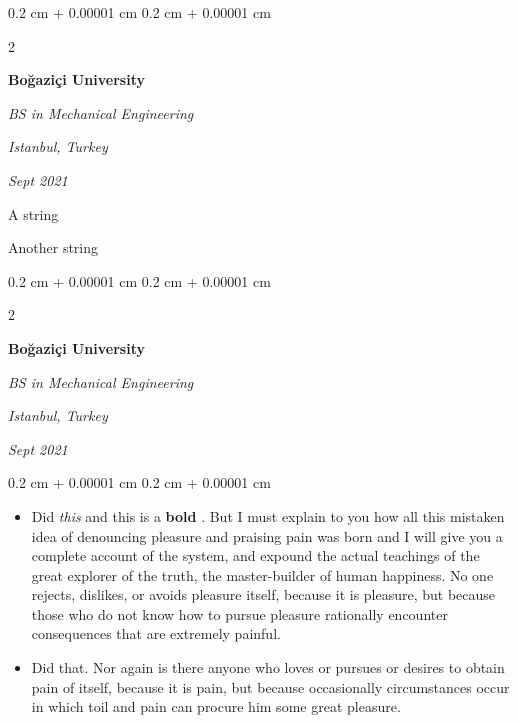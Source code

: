 \documentclass[10pt, letterpaper]{article}
\newenvironment{summary}{
    \begin{description}[
        topsep=0.10 cm,
        parsep=0.10 cm,
        partopsep=0pt,
        itemsep=0pt,
        leftmargin=0.4 cm + 10pt
    ]
}{
    \end{description}
} %
\newenvironment{highlights}{
    \begin{itemize}[
        topsep=0.10 cm,
        parsep=0.10 cm,
        partopsep=0pt,
        itemsep=0pt,
        leftmargin=0.4 cm + 10pt
    ]
}{
    \end{itemize}
} %
\newenvironment{onecolentry}{
    \begin{adjustwidth}{
        0.2 cm + 0.00001 cm
    }{
        0.2 cm + 0.00001 cm
    }
}{
    \end{adjustwidth}
} %
\newenvironment{twocolentry}[2][]{
    \onecolentry
    \def\secondColumn{#2}
    \setcolumnwidth{\fill, 4.5 cm}
    \begin{paracol}{2}
}{
    \switchcolumn \raggedleft \secondColumn
    \end{paracol}
    \endonecolentry
} %
\let\hrefWithoutArrow\href
\renewcommand{\href}[2]{\hrefWithoutArrow{#1}{\ifthenelse{\equal{#2}{}}{ }{#2 }\raisebox{.15ex}{\footnotesize \faExternalLink*}}}
\begin{document}
        \vspace{0.2 cm}

        \begin{twocolentry}{
        \textit{Istanbul, Turkey}    
            
        \textit{Sept 2021}}
            \textbf{Boğaziçi University}

            \textit{BS in Mechanical Engineering}
        \end{twocolentry}
            \begin{summary}
                \item A string
                \item Another string
            \end{summary}


        \vspace{0.2 cm}

        \begin{twocolentry}{
        \textit{Istanbul, Turkey}    
            
        \textit{Sept 2021}}
            \textbf{Boğaziçi University}

            \textit{BS in Mechanical Engineering}
        \end{twocolentry}
        \vspace{0.10 cm}
        \begin{onecolentry}
            \begin{highlights}
                \item Did \textit{this} and this is a \textbf{bold} \href{https://example.com}{link}. But I must explain to you how all this mistaken idea of denouncing pleasure and praising pain was born and I will give you a complete account of the system, and expound the actual teachings of the great explorer of the truth, the master-builder of human happiness. No one rejects, dislikes, or avoids pleasure itself, because it is pleasure, but because those who do not know how to pursue pleasure rationally encounter consequences that are extremely painful.
                \item Did that. Nor again is there anyone who loves or pursues or desires to obtain pain of itself, because it is pain, but because occasionally circumstances occur in which toil and pain can procure him some great pleasure.
            \end{highlights}
        \end{onecolentry}


        \vspace{0.2 cm}
\end{document}
